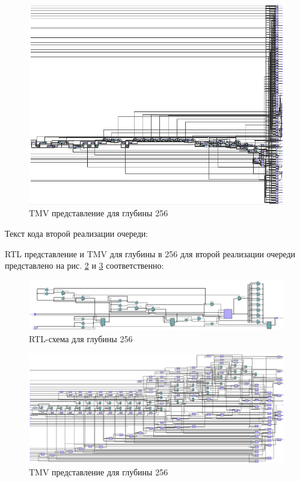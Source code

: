 \documentclass[a4paper,14pt]{article}
\begin{document}
	\begin{figure}[H]
		\centering
		\includegraphics[width=0.8\linewidth]{images/z6_tmv_256_v1}
		\caption{TMV представление для глубины 256}
		\label{fig:z6_tmv_256_v1}
	\end{figure}
	
	Текст кода второй реализации очереди:
	
	
	RTL представление и TMV для глубины в 256 для второй реализации очереди представлено на рис.  \ref{fig:z6_rtl_256_v2} и  \ref{fig:z6_tmv_256_v2} соответственно:
	
		\begin{figure}[H]
		\centering
		\includegraphics[width=0.8\linewidth]{images/z6_rtl_256_v2}
		\caption{RTL-схема для глубины 256}
		\label{fig:z6_rtl_256_v2}
	\end{figure}
	
	\begin{figure}[H]
		\centering
		\includegraphics[width=0.8\linewidth]{images/z6_tmv_256_v2}
		\caption{TMV представление для глубины 256}
		\label{fig:z6_tmv_256_v2}
	\end{figure}
	
\end{document}
